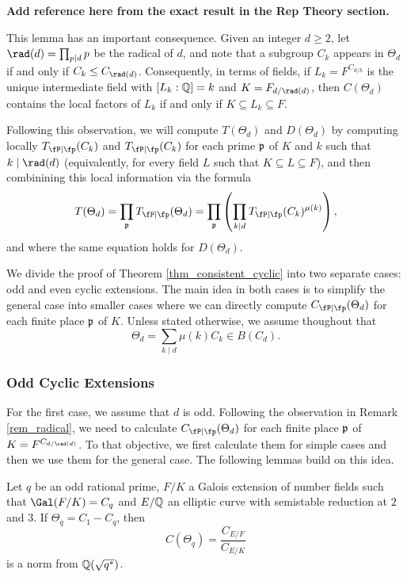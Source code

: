 \textbf{Add reference here from the exact result in the Rep Theory section.}

\begin{rem}\label{rem_radical}
    This lemma has an important consequence. Given an integer $d\geq2$, let $\rad(d)=\prod_{p\mid d}p$ be the radical of $d$, and note that a subgroup $C_k$ appears in $\Theta_d$ if and only if $C_k\leq C_{\rad(d)}$. Consequently, in terms of fields, if $L_k=F^{C_{d/k}}$ is the unique intermediate field with $[L_k:\mathbb{Q}]=k$ and $K=F_{d/\rad(d)}$, then $C(\Theta_d)$ contains the local factors of $L_k$ if and only if $K\subseteq L_k\subseteq F$.

    Following this observation, we will compute $T(\Theta_d)$ and $D(\Theta_d)$ by computing locally $\Tp(C_k)$ and $\Tp(C_k)$ for each prime $\mathfrak{p}$ of $K$ and $k$ such that $k\mid\rad(d)$ (equivalently, for every field $L$ such that $K\subseteq L\subseteq F$), and then combinining this local information via the formula
    \begin{equation}\label{eqn_local_contr}
        T(\Theta_d)=\prod_{\pp}\Tp(\Theta_d)=\prod_\pp\left(\prod_{k\mid d} \Tp(C_k)^{\mu(k)}\right),    
    \end{equation}
    and where the same equation holds for $D(\Theta_d)$.
\end{rem}



We divide the proof of Theorem \ref{thm_consistent_cyclic} into two separate cases: odd and even cyclic extensions. The main idea in both cases is to simplify the general case into smaller cases where we can directly compute $\Cp(\Theta_d)$ for each finite place $\mathfrak{p}$ of $K$. Unless stated otherwise, we assume thoughout that $$\Theta_d=\sum_{k\mid d}\mu(k)C_k\in B(C_d).$$

\subsubsection{Odd Cyclic Extensions} \label{case_Cp}

For the first case, we assume that $d$ is odd. Following the observation in Remark \ref{rem_radical}, we need to calculate $\Cp(\Theta_d)$ for each finite place $\mathfrak{p}$ of $K=F^{C_{d/\rad(d)}}$. To that objective, we first calculate them for simple cases and then we use them for the general case. The following lemmas build on this idea.

\begin{lemma}\label{lem_Cp}
    Let $q$ be an odd rational prime, $F/K$ a Galois extension of number fields such that $\Gal(F/K)=C_q$ and $E/\mathbb{Q}$ an elliptic curve with semistable reduction at $2$ and $3$. If $\Theta_q=C_1-C_q$, then 
    $$C(\Theta_q)=\frac{C_{E/F}}{C_{E/K}}$$
    is a norm from $\mathbb{Q}(\sqrt{q^*})$.
\end{lemma}

